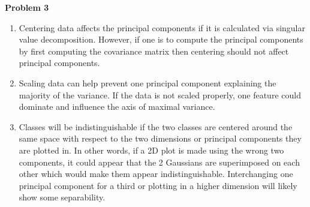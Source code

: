 \documentclass[11pt,letterpaper]{article}
\begin{document}
\textbf{Problem 3}
\begin{enumerate}[labelindent=0pt]
\item 
Centering data affects the principal components if it is calculated via singular
value decomposition.  However, if one is to compute the principal components by
first computing the covariance matrix then centering should not affect
principal components.

\item 
Scaling data can help prevent one principal component explaining the majority of
the variance.  If the data is not scaled properly, one feature could dominate
and influence the axis of maximal variance. 

\item 
Classes will be indistinguishable if the two classes are centered around the
same space with respect to the two dimensions or principal components they are
plotted in.  In other words, if a 2D plot is made using the wrong two
components, it could appear that the 2 Gaussians are superimposed on each other
which would make them appear indistinguishable.  Interchanging one principal
component for a third or plotting in a higher dimension will likely show some
separability.


\end{enumerate}
\end{document}

